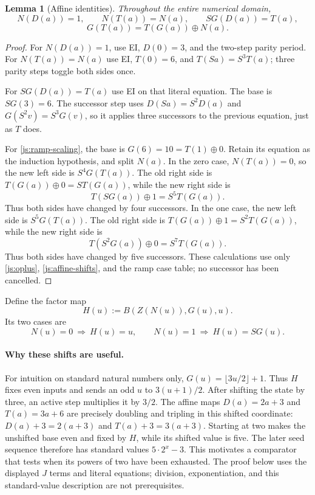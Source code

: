 \documentclass[11pt,letterpaper]{article}
\newtheorem{lemma}[theorem]{Lemma}
\theoremstyle{definition}\newtheorem{definition}[theorem]{Definition}
\theoremstyle{remark}\newtheorem{remark}[theorem]{Remark}
\begin{document}
\begin{lemma}[Affine identities]\label{js:affine-lemmas}
Throughout the entire numerical domain,
\[
 N(D(a))=1,\qquad N(T(a))=N(a),\qquad
 S G(D(a))=T(a),
 \tag{Affine parity and ramp}\label{js:affine-parity}
\]
\[
 G(T(a))=T(G(a))\oplus N(a).
 \tag{Ramp scaling}\label{js:ramp-scaling}
\]
\end{lemma}
\begin{proof}
For $N(D(a))=1$, use EI, $D(0)=3$, and the two-step parity
period.  For $N(T(a))=N(a)$ use EI, $T(0)=6$, and
$T(Sa)=S^3T(a)$; three parity steps toggle both sides once.

For $S G(D(a))=T(a)$ use EI on that literal equation.  The base
is $S G(3)=6$.  The successor step uses
$D(Sa)=S^2D(a)$ and $G(S^2v)=S^3G(v)$, so it applies three
successors to the previous equation, just as $T$ does.

For \eqref{js:ramp-scaling}, the base is
$G(6)=10=T(1)\oplus0$.  Retain its equation as the induction
hypothesis, and split $N(a)$.  In the zero case, $N(T(a))=0$,
so the new left side is $S^4G(T(a))$.  The old right side is
$T(G(a))\oplus0=S T(G(a))$, while the new right side is
\[
 T(SG(a))\oplus1=S^5T(G(a)).
\]
Thus both sides have changed by four successors.  In the one case,
the new left side is $S^5G(T(a))$.  The old right side is
$T(G(a))\oplus1=S^2T(G(a))$, while the new right side is
\[
 T(S^2G(a))\oplus0=S^7T(G(a)).
\]
Thus both sides have changed by five successors.  These calculations
use only \eqref{js:oplus}, \eqref{js:affine-shifts}, and the ramp
case table; no successor has been cancelled.
\end{proof}

Define the factor map
\[
 H(u):=B(Z(N(u)),G(u),u).
\]
Its two cases are
\[
 N(u)=0\ \Longrightarrow\ H(u)=u,\qquad
 N(u)=1\ \Longrightarrow\ H(u)=S G(u).
\]

\paragraph{Why these shifts are useful.}
For intuition on standard natural numbers only, $G(u)=\lfloor3u/2\rfloor+1$.
Thus $H$ fixes even inputs and sends an odd $u$ to $3(u+1)/2$.
After shifting the state by three, an active step multiplies it by $3/2$.
The affine maps $D(a)=2a+3$ and $T(a)=3a+6$ are precisely doubling
and tripling in this shifted coordinate: $D(a)+3=2(a+3)$ and
$T(a)+3=3(a+3)$. Starting at two makes the unshifted base even and
fixed by $H$, while its shifted value is five. The later seed sequence
therefore has standard values $5\cdot2^x-3$. This motivates a comparator
that tests when its powers of two have been exhausted. The proof below
uses the displayed $J$ terms and literal equations; division, exponentiation,
and this standard-value description are not prerequisites.
\end{document}
